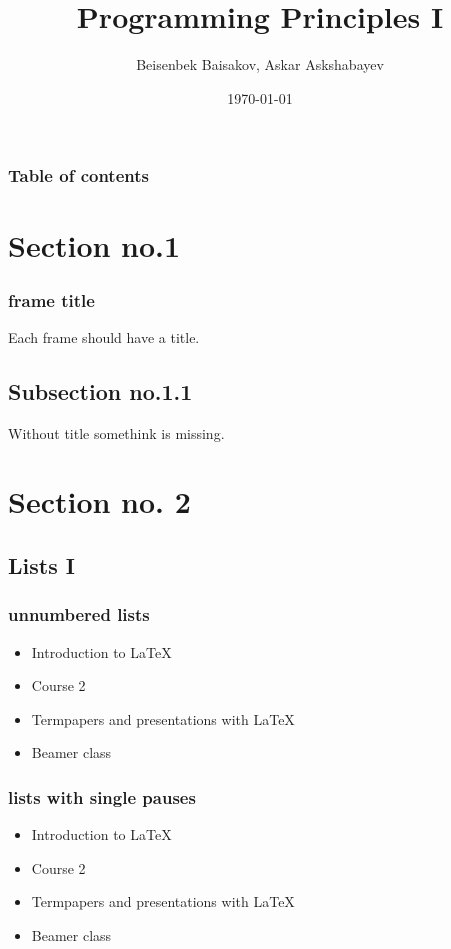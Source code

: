 \documentclass[hyperref={pdfpagelabels=false}]{beamer}
\title{Programming Principles I}
\author{Beisenbek Baisakov, Askar Askshabayev}
\date{\today}
\begin{document}
    \begin{frame}
    \titlepage
    \end{frame} 
    
    
    \begin{frame}
    \frametitle{Table of contents}
    \tableofcontents
    \end{frame} 
    
    
    \section{Section no.1} 
    \begin{frame}
    \frametitle{frame title} 
    Each frame should have a title.
    \end{frame}
    \subsection{Subsection no.1.1  }
    \begin{frame}
    Without title somethink is missing. 
    \end{frame}
    
    
    \section{Section no. 2} 
    \subsection{Lists I}
    \begin{frame}
    \frametitle{unnumbered lists}
    \begin{itemize}
    \item Introduction to  \LaTeX{}  
    \item Course 2 
    \item Termpapers and presentations with \LaTeX{}  
    \item Beamer class
    \end{itemize} 
    \end{frame}
    
    \begin{frame}\frametitle{lists with single pauses}
    \begin{itemize}
    \item Introduction to  \LaTeX{}  \pause 
    \item Course 2 \pause 
    \item Termpapers and presentations with \LaTeX{}  \pause 
    \item Beamer class
    \end{itemize} 
    \end{frame}
    
\end{document}
